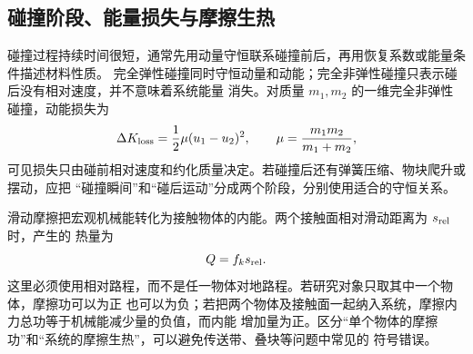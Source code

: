 \subsection{碰撞阶段、能量损失与摩擦生热}

碰撞过程持续时间很短，通常先用动量守恒联系碰撞前后，再用恢复系数或能量条件描述材料性质。
完全弹性碰撞同时守恒动量和动能；完全非弹性碰撞只表示碰后没有相对速度，并不意味着系统能量
消失。对质量 $m_1,m_2$ 的一维完全非弹性碰撞，动能损失为
\begin{equation*}
 \Delta K_{\rm loss}=\frac12\mu(u_1-u_2)^2,
 \qquad \mu=\frac{m_1m_2}{m_1+m_2},
\end{equation*}
可见损失只由碰前相对速度和约化质量决定。若碰撞后还有弹簧压缩、物块爬升或摆动，应把
“碰撞瞬间”和“碰后运动”分成两个阶段，分别使用适合的守恒关系。

滑动摩擦把宏观机械能转化为接触物体的内能。两个接触面相对滑动距离为 $s_{\rm rel}$ 时，产生的
热量为
\begin{equation*}
 Q=f_k s_{\rm rel}.
\end{equation*}
这里必须使用相对路程，而不是任一物体对地路程。若研究对象只取其中一个物体，摩擦功可以为正
也可以为负；若把两个物体及接触面一起纳入系统，摩擦内力总功等于机械能减少量的负值，而内能
增加量为正。区分“单个物体的摩擦功”和“系统的摩擦生热”，可以避免传送带、叠块等问题中常见的
符号错误。

